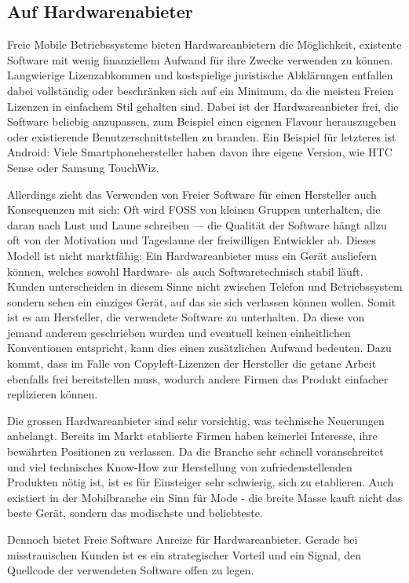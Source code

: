 \subsection{Auf Hardwarenabieter}
Freie Mobile Betriebssysteme bieten Hardwareanbietern die Möglichkeit, existente Software mit wenig finanziellem Aufwand für ihre Zwecke verwenden zu können. Langwierige Lizenzabkommen und kostspielige juristische Abklärungen entfallen dabei vollständig oder beschränken sich auf ein Minimum, da die meisten Freien Lizenzen in einfachem Stil gehalten sind. Dabei ist der Hardwareanbieter frei, die Software beliebig anzupassen, zum Beispiel einen eigenen Flavour herauszugeben oder existierende Benutzerschnittstellen zu branden. Ein Beispiel für letzteres ist Android: Viele Smartphonehersteller haben davon ihre eigene Version, wie HTC Sense oder Samsung TouchWiz.

Allerdings zieht das Verwenden von Freier Software für einen Hersteller auch Konsequenzen mit sich: Oft wird FOSS von kleinen Gruppen unterhalten, die daran nach Lust und Laune schreiben --- die Qualität der Software hängt allzu oft von der Motivation und Tageslaune der freiwilligen Entwickler ab. Dieses Modell ist nicht marktfähig: Ein Hardwareanbieter muss ein Gerät ausliefern können, welches sowohl Hardware- als auch Softwaretechnisch stabil läuft. Kunden unterscheiden in diesem Sinne nicht zwischen Telefon und Betriebssystem sondern sehen ein einziges Gerät, auf das sie sich verlassen können wollen. Somit ist es am Hersteller, die verwendete Software zu unterhalten. Da diese von jemand anderem geschrieben wurden und eventuell keinen einheitlichen Konventionen entspricht, kann dies einen zusätzlichen Aufwand bedeuten. Dazu kommt, dass im Falle von Copyleft-Lizenzen der Hersteller die getane Arbeit ebenfalls frei bereitstellen muss, wodurch andere Firmen das Produkt einfacher replizieren können.

Die grossen Hardwareanbieter sind sehr vorsichtig, was technische Neuerungen anbelangt. Bereits im Markt etablierte Firmen haben keinerlei Interesse, ihre bewährten Positionen zu verlassen. Da die Branche sehr schnell voranschreitet und viel technisches Know-How zur Herstellung von zufriedenstellenden Produkten nötig ist, ist es für Einsteiger sehr schwierig, sich zu etablieren. Auch existiert in der Mobilbranche ein Sinn für Mode - die breite Masse kauft nicht das beste Gerät, sondern das modischste und beliebteste.

Dennoch bietet Freie Software Anreize für Hardwareanbieter. Gerade bei misstrauischen Kunden ist es ein strategischer Vorteil und ein Signal, den Quellcode der verwendeten Software offen zu legen.
\columnbreak

